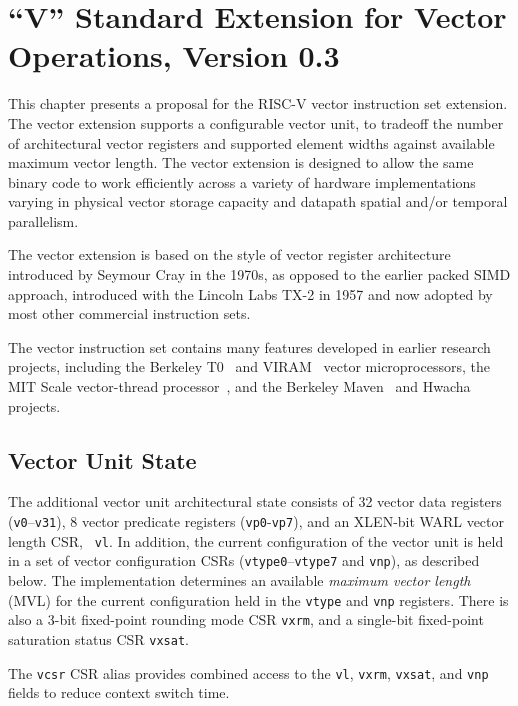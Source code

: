 \chapter{``V'' Standard Extension for Vector Operations, Version 0.3}
\label{sec:bits}

This chapter presents a proposal for the RISC-V vector instruction set
extension.  The vector extension supports a configurable vector unit,
to tradeoff the number of architectural vector registers and supported
element widths against available maximum vector length.  The vector
extension is designed to allow the same binary code to work
efficiently across a variety of hardware implementations varying in
physical vector storage capacity and datapath spatial and/or temporal
parallelism.

\begin{commentary}
The vector extension is based on the style of vector register
architecture introduced by Seymour Cray in the 1970s, as opposed to
the earlier packed SIMD approach, introduced with the Lincoln Labs
TX-2 in 1957 and now adopted by most other commercial instruction
sets.

The vector instruction set contains many features developed in earlier
research projects, including the Berkeley T0~\cite{} and VIRAM~\cite{}
vector microprocessors, the MIT Scale vector-thread processor~\cite{},
and the Berkeley Maven~\cite{} and Hwacha~\cite{} projects.
\end{commentary}

\section{Vector Unit State}

The additional vector unit architectural state consists of 32 vector
data registers ({\tt v0}--{\tt v31}), 8 vector predicate registers
({\tt vp0}-{\tt vp7}), and an XLEN-bit WARL vector length CSR, {\tt
  vl}.  In addition, the current configuration of the vector unit is
held in a set of vector configuration CSRs ({\tt vtype0}--{\tt vtype7}
and {\tt vnp}), as described below.  The implementation determines an
available {\em maximum vector length} (MVL) for the current
configuration held in the {\tt vtype} and {\tt vnp} registers.  There
is also a 3-bit fixed-point rounding mode CSR {\tt vxrm}, and a
single-bit fixed-point saturation status CSR {\tt vxsat}.

The {\tt vcsr} CSR alias provides combined access to the {\tt vl},
{\tt vxrm}, {\tt vxsat}, and {\tt vnp} fields to reduce context switch
time.

